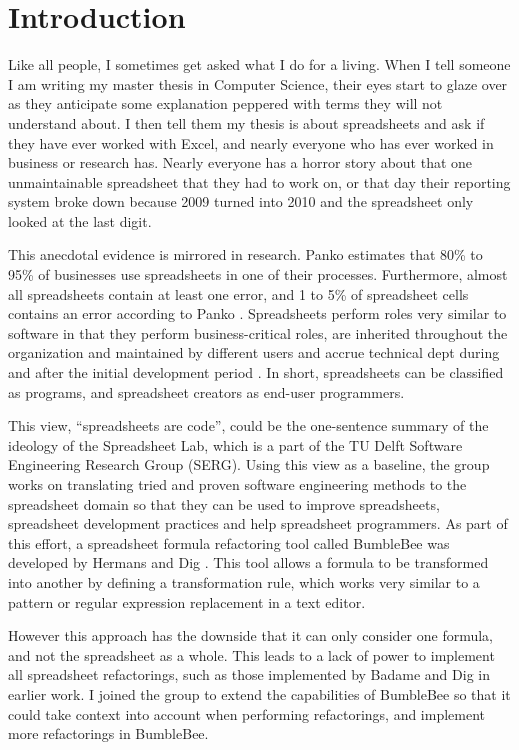 \chapter{Introduction}
\label{chapter:introduction}

Like all people, I sometimes get asked what I do for a living.
When I tell someone I am writing my master thesis in Computer Science, their eyes start to glaze over as they anticipate some explanation peppered with terms they will not understand about.
I then tell them my thesis is about spreadsheets and ask if they have ever worked with Excel, and nearly everyone who has ever worked in business or research has.
Nearly everyone has a horror story about that one unmaintainable spreadsheet that they had to work on, or that day their reporting system broke down because 2009 turned into 2010 and the spreadsheet only looked at the last digit.

This anecdotal evidence is mirrored in research.
Panko \cite{panko2006facing} estimates that 80\% to 95\% of businesses use spreadsheets in one of their processes.
Furthermore, almost all spreadsheets contain at least one error, and 1 to 5\% of spreadsheet cells contains an error according to Panko \cite{panko1998we}.
Spreadsheets perform roles very similar to software in that they perform business-critical roles, are inherited throughout the organization and maintained by different users and accrue technical dept during and after the initial development period \cite{panko1998we}.
In short, spreadsheets can be classified as programs, and spreadsheet creators as end-user programmers.

This view, ``spreadsheets are code'', could be the one-sentence summary of the ideology of the Spreadsheet Lab, which is a part of the TU Delft Software Engineering Research Group (SERG).
Using this view as a baseline, the group works on translating tried and proven software engineering methods to the spreadsheet domain so that they can be used to improve spreadsheets, spreadsheet development practices and help spreadsheet programmers.
As part of this effort, a spreadsheet formula refactoring tool called BumbleBee was developed by Hermans and Dig \cite{hermans2014bumblebee}.
This tool allows a formula to be transformed into another by defining a transformation rule, which works very similar to a pattern or regular expression replacement in a text editor.

However this approach has the downside that it can only consider one formula, and not the spreadsheet as a whole.
This leads to a lack of power to implement all spreadsheet refactorings, such as those implemented by Badame and Dig \cite{badame2012refactoring} in earlier work.
I joined the group to extend the capabilities of BumbleBee so that it could take context into account when performing refactorings, and implement more refactorings in BumbleBee.

